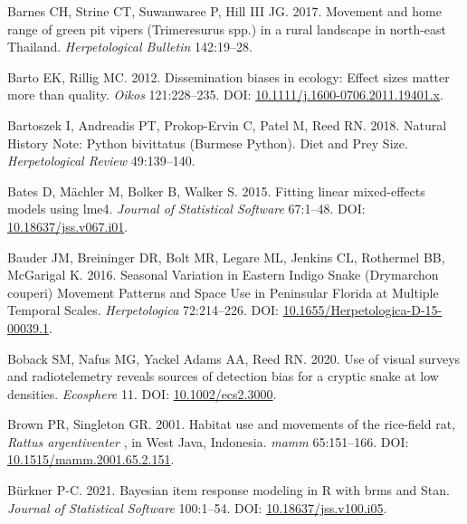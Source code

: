 \documentclass[10pt,a4paper]{article}
\newlength{\cslhangindent}
\newenvironment{CSLReferences}[2] %
 {\begin{list}{}{%
  \setlength{\itemindent}{0pt}
  \setlength{\leftmargin}{0pt}
  \setlength{\parsep}{0pt}
  \ifodd #1
   \setlength{\leftmargin}{\cslhangindent}
   \setlength{\itemindent}{-1\cslhangindent}
  \fi
  \setlength{\itemsep}{#2\baselineskip}}}
 {\end{list}}
\begin{document}
\begin{CSLReferences}{1}{0}
Barnes CH, Strine CT, Suwanwaree P, Hill III JG. 2017. Movement and home range of green pit vipers ({Trimeresurus} spp.) in a rural landscape in north-east {Thailand}. \emph{Herpetological Bulletin} 142:19--28.

Barto EK, Rillig MC. 2012. Dissemination biases in ecology: Effect sizes matter more than quality. \emph{Oikos} 121:228--235. DOI: \href{https://doi.org/10.1111/j.1600-0706.2011.19401.x}{10.1111/j.1600-0706.2011.19401.x}.

Bartoszek I, Andreadis PT, Prokop-Ervin C, Patel M, Reed RN. 2018. Natural {History} {Note}: {Python} bivittatus ({Burmese} {Python}). {Diet} and {Prey} {Size}. \emph{Herpetological Review} 49:139--140.

Bates D, Mächler M, Bolker B, Walker S. 2015. Fitting linear mixed-effects models using {lme4}. \emph{Journal of Statistical Software} 67:1--48. DOI: \href{https://doi.org/10.18637/jss.v067.i01}{10.18637/jss.v067.i01}.

Bauder JM, Breininger DR, Bolt MR, Legare ML, Jenkins CL, Rothermel BB, McGarigal K. 2016. Seasonal {Variation} in {Eastern} {Indigo} {Snake} ({Drymarchon} couperi) {Movement} {Patterns} and {Space} {Use} in {Peninsular} {Florida} at {Multiple} {Temporal} {Scales}. \emph{Herpetologica} 72:214--226. DOI: \href{https://doi.org/10.1655/Herpetologica-D-15-00039.1}{10.1655/Herpetologica-D-15-00039.1}.

Boback SM, Nafus MG, Yackel Adams AA, Reed RN. 2020. Use of visual surveys and radiotelemetry reveals sources of detection bias for a cryptic snake at low densities. \emph{Ecosphere} 11. DOI: \href{https://doi.org/10.1002/ecs2.3000}{10.1002/ecs2.3000}.

Brown PR, Singleton GR. 2001. Habitat use and movements of the rice-field rat, \emph{{Rattus} argentiventer} , in {West} {Java}, {Indonesia}. \emph{mamm} 65:151--166. DOI: \href{https://doi.org/10.1515/mamm.2001.65.2.151}{10.1515/mamm.2001.65.2.151}.

Bürkner P-C. 2021. Bayesian item response modeling in {R} with {brms} and {Stan}. \emph{Journal of Statistical Software} 100:1--54. DOI: \href{https://doi.org/10.18637/jss.v100.i05}{10.18637/jss.v100.i05}.


\end{CSLReferences}
\end{document}

